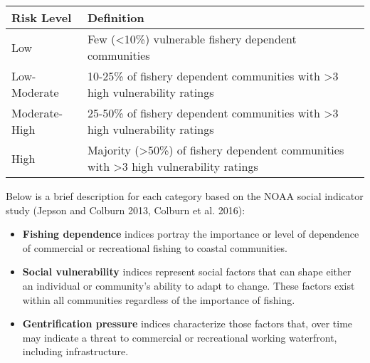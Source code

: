 \documentclass[11pt,]{article}
\providecommand{\tightlist}{%
  \setlength{\itemsep}{0pt}\setlength{\parskip}{0pt}}
\begin{document}
\begin{longtable}[]{@{}ll@{}}
\toprule
\begin{minipage}[b]{0.22\columnwidth}\raggedright\strut
Risk Level\strut
\end{minipage} & \begin{minipage}[b]{0.72\columnwidth}\raggedright\strut
Definition\strut
\end{minipage}\tabularnewline
\midrule
\endhead
\begin{minipage}[t]{0.22\columnwidth}\raggedright\strut
Low\strut
\end{minipage} & \begin{minipage}[t]{0.72\columnwidth}\raggedright\strut
Few (\textless{}10\%) vulnerable fishery dependent communities\strut
\end{minipage}\tabularnewline
\begin{minipage}[t]{0.22\columnwidth}\raggedright\strut
Low-Moderate\strut
\end{minipage} & \begin{minipage}[t]{0.72\columnwidth}\raggedright\strut
10-25\% of fishery dependent communities with \textgreater{}3 high
vulnerability ratings\strut
\end{minipage}\tabularnewline
\begin{minipage}[t]{0.22\columnwidth}\raggedright\strut
Moderate-High\strut
\end{minipage} & \begin{minipage}[t]{0.72\columnwidth}\raggedright\strut
25-50\% of fishery dependent communities with \textgreater{}3 high
vulnerability ratings\strut
\end{minipage}\tabularnewline
\begin{minipage}[t]{0.22\columnwidth}\raggedright\strut
High\strut
\end{minipage} & \begin{minipage}[t]{0.72\columnwidth}\raggedright\strut
Majority (\textgreater{}50\%) of fishery dependent communities with
\textgreater{}3 high vulnerability ratings\strut
\end{minipage}\tabularnewline
\bottomrule
\end{longtable}

Below is a brief description for each category based on the NOAA social
indicator study (Jepson and Colburn 2013, Colburn et al. 2016):

\begin{itemize}
\tightlist
\item
  \textbf{Fishing dependence} indices portray the importance or level of
  dependence of commercial or recreational fishing to coastal
  communities.
\item
  \textbf{Social vulnerability} indices represent social factors that
  can shape either an individual or community's ability to adapt to
  change. These factors exist within all communities regardless of the
  importance of fishing.
\item
  \textbf{Gentrification pressure} indices characterize those factors
  that, over time may indicate a threat to commercial or recreational
  working waterfront, including infrastructure.
\end{itemize}
\end{document}
